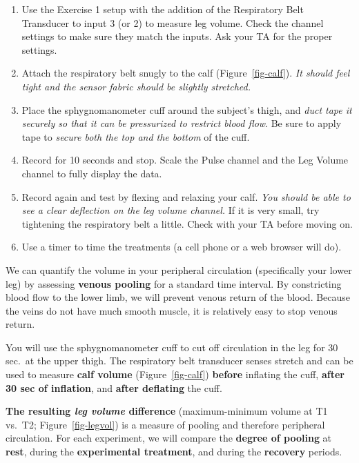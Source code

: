 \documentclass[
  letterpaper,
  DIV=11,
  numbers=noendperiod,
  oneside]{scrartcl}
\providecommand{\tightlist}{%
  \setlength{\itemsep}{0pt}\setlength{\parskip}{0pt}}\usepackage{longtable,booktabs,array}
\begin{document}
\begin{enumerate}
\def\labelenumi{\arabic{enumi}.}
\tightlist
\item
  Use the Exercise 1 setup with the addition of the Respiratory Belt
  Transducer to input 3 (or 2) to measure leg volume. Check the channel
  settings to make sure they match the inputs. Ask your TA for the
  proper settings.
\item
  Attach the respiratory belt snugly to the calf
  (Figure~\ref{fig-calf}). \emph{It should feel tight and the sensor
  fabric should be slightly stretched.}
\item
  Place the sphygnomanometer cuff around the subject's thigh, and
  \emph{duct tape it securely so that it can be pressurized to restrict
  blood flow}. Be sure to apply tape to \emph{secure both the top and
  the bottom} of the cuff.
\item
  Record for 10 seconds and stop. Scale the Pulse channel and the Leg
  Volume channel to fully display the data.
\item
  Record again and test by flexing and relaxing your calf. \emph{You
  should be able to see a clear deflection on the leg volume channel.}
  If it is very small, try tightening the respiratory belt a little.
  Check with your TA before moving on.
\item
  Use a timer to time the treatments (a cell phone or a web browser will
  do).
\end{enumerate}

\begin{tcolorbox}[enhanced jigsaw, arc=.35mm, leftrule=.75mm, coltitle=black, left=2mm, rightrule=.15mm, colbacktitle=quarto-callout-note-color!10!white, opacitybacktitle=0.6, breakable, titlerule=0mm, colback=white, bottomrule=.15mm, toprule=.15mm, opacityback=0, colframe=quarto-callout-note-color-frame, toptitle=1mm, title=\textcolor{quarto-callout-note-color}{\faInfo}\hspace{0.5em}{The idea behind measuring peripheral circulation using leg volume
changes}, bottomtitle=1mm]

We can quantify the volume in your peripheral circulation (specifically
your lower leg) by assessing \textbf{venous pooling} for a standard time
interval. By constricting blood flow to the lower limb, we will prevent
venous return of the blood. Because the veins do not have much smooth
muscle, it is relatively easy to stop venous return.

You will use the sphygnomanometer cuff to cut off circulation in the leg
for 30 sec.~at the upper thigh. The respiratory belt transducer senses
stretch and can be used to measure \textbf{calf volume}
(Figure~\ref{fig-calf}) \textbf{before} inflating the cuff,
\textbf{after 30 sec of inflation}, and \textbf{after deflating} the
cuff.

\textbf{The resulting \emph{leg volume} difference} (maximum-minimum
volume at T1 vs.~T2; Figure~\ref{fig-legvol}) is a measure of pooling
and therefore peripheral circulation. For each experiment, we will
compare the \textbf{degree of pooling} at \textbf{rest}, during the
\textbf{experimental treatment}, and during the \textbf{recovery}
periods.

\end{tcolorbox}
\end{document}

